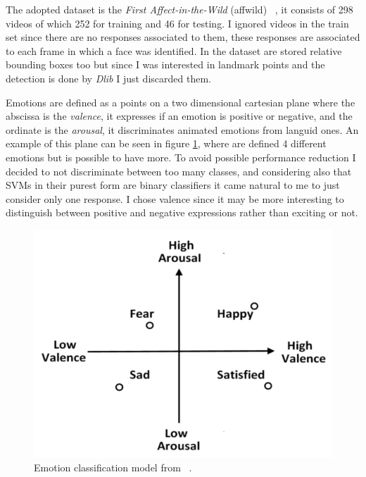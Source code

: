 The adopted dataset is the \textit{First Affect-in-the-Wild} (affwild) ~\cite{dataset:affwild}, it consists of 298 videos of which 252 for training and 46 for testing.
I ignored videos in the train set since there are no responses associated to them, these responses are associated to each frame in which a face was identified.
In the dataset are stored relative bounding boxes too but since I was interested in landmark points and the detection is done by \textit{Dlib} I just discarded them.

Emotions are defined as a points on a two dimensional cartesian plane where the abscissa is the \textit{valence}, it expresses if an emotion is positive or negative, and the ordinate is the \textit{arousal}, it discriminates animated emotions from languid ones.
An example of this plane can be seen in figure \ref{fig:emotion_classification}, where are defined 4 different emotions but is possible to have more.
To avoid possible performance reduction I decided to not discriminate between too many classes, and considering also that SVMs in their purest form are binary classifiers it came natural to me to just consider only one response.
I chose valence since it may be more interesting to distinguish between positive and negative expressions rather than exciting or not.

\begin{figure}[h!t]
    \centering
    \includegraphics[scale=0.45]{images/emotion-classification.png}
    \caption{Emotion classification model from ~\cite{emotion_classification}.}
    \label{fig:emotion_classification}
\end{figure}
